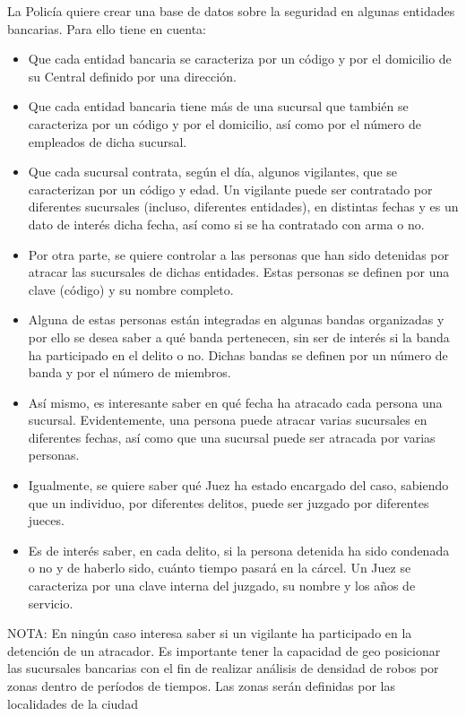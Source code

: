 La Policía quiere crear una base de datos sobre la seguridad en algunas entidades bancarias. Para ello tiene en cuenta:
\begin{itemize} 
\item Que cada entidad bancaria se caracteriza por un código y por el domicilio de su Central definido por una dirección.
\item Que cada entidad bancaria tiene más de una sucursal que también se caracteriza por un código y por el domicilio, así como por el número de empleados de dicha sucursal.
\item Que cada sucursal contrata, según el día, algunos vigilantes, que se caracterizan por un código y edad. Un vigilante puede ser contratado por diferentes sucursales (incluso, diferentes entidades), en distintas fechas y es un dato de interés dicha fecha, así como si se ha contratado con arma o no.
\item Por otra parte, se quiere controlar a las personas que han sido detenidas por atracar las sucursales de dichas entidades. Estas personas se definen por una clave (código) y su nombre completo.
\item Alguna de estas personas están integradas en algunas bandas organizadas y por ello se desea saber a qué banda pertenecen, sin ser de interés si la banda ha participado en el delito o no. Dichas bandas se definen por un número de banda y por el número de miembros.
\item Así mismo, es interesante saber en qué fecha ha atracado cada persona una sucursal.
Evidentemente, una persona puede atracar varias sucursales en diferentes fechas, así como que una sucursal puede ser atracada por varias personas.
\item Igualmente, se quiere saber qué Juez ha estado encargado del caso, sabiendo que un individuo, por diferentes delitos, puede ser juzgado por diferentes jueces.
\item Es de interés saber, en cada delito, si la persona detenida ha sido condenada o no y de haberlo sido, cuánto tiempo pasará en la cárcel. Un Juez se caracteriza por una clave interna del juzgado, su nombre y los años de servicio.
\end{itemize}
NOTA: En ningún caso interesa saber si un vigilante ha participado en la detención de un atracador. Es importante tener la capacidad de geo posicionar las sucursales bancarias con el fin de realizar análisis de densidad de robos por zonas dentro de períodos de tiempos. Las zonas serán definidas por las localidades de la ciudad